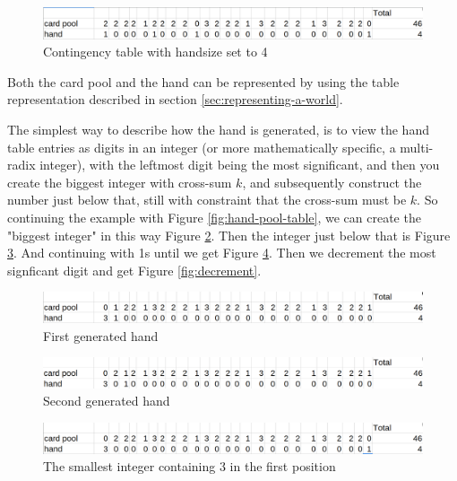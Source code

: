 \begin{figure}
	\centering
\includegraphics[width=13cm,frame]{images/contigency_table_with_hand.png}
	\caption{Contingency table with handsize set to 4}
	\label{fig:hand-pool-table-with-hand}
\end{figure}

Both the card pool and the hand can be represented by using the table representation described in section \ref{sec:representing-a-world}.

The simplest way to describe how the hand is generated, is to view the hand table entries as digits in an integer (or more mathematically specific, a multi-radix integer), with the leftmost digit being the most significant, and then you create the biggest integer with cross-sum $k$, and subsequently construct the number just below that, still with constraint that the cross-sum must be $k$. So continuing the example with Figure \ref{fig:hand-pool-table}, we can create the "biggest integer" in this way Figure \ref{fig:biggest-integer}. Then the integer just below that is Figure \ref{fig:next-integer}. And continuing with 1s until we get Figure \ref{fig:etc-one}.
Then we decrement the most signficant digit and get Figure \ref{fig:decrement}.

\begin{figure}
	\centering
\includegraphics[width=13cm,frame]{images/biggest_integer.png}
	\caption{First generated hand}
	\label{fig:biggest-integer}
\end{figure}

\begin{figure}
	\centering
\includegraphics[width=13cm,frame]{images/next-biggest.png}
	\caption{Second generated hand}
	\label{fig:next-integer}
\end{figure}

\begin{figure}
	\centering
\includegraphics[width=13cm,frame]{images/etc_one.png}
	\caption{The smallest integer containing 3 in the first position}
	\label{fig:etc-one}
\end{figure}


